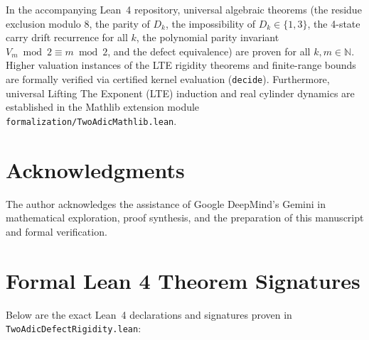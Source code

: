 \documentclass[11pt,reqno]{amsart}
\theoremstyle{definition}
\numberwithin{equation}{section}
\begin{document}
In the accompanying Lean~4 repository, universal algebraic theorems (the residue exclusion modulo $8$, the parity of $D_k$, the impossibility of $D_k \in \{1, 3\}$, the 4-state carry drift recurrence for all $k$, the polynomial parity invariant $V_m \bmod 2 \equiv m \bmod 2$, and the defect equivalence) are proven for all $k, m \in \mathbb{N}$. Higher valuation instances of the LTE rigidity theorems and finite-range bounds are formally verified via certified kernel evaluation (\texttt{decide}). Furthermore, universal Lifting The Exponent (LTE) induction and real cylinder dynamics are established in the Mathlib extension module \nolinkurl{formalization/TwoAdicMathlib.lean}.

\section*{Acknowledgments}
The author acknowledges the assistance of Google DeepMind's Gemini in mathematical exploration, proof synthesis, and the preparation of this manuscript and formal verification.

\appendix
\section{Formal Lean 4 Theorem Signatures}
Below are the exact Lean~4 declarations and signatures proven in \texttt{TwoAdicDefectRigidity.lean}:
\end{document}
